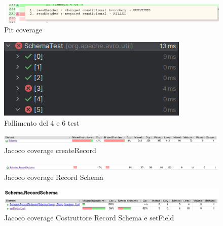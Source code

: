 \documentclass[12pt, a4paper]{article}
\begin{document}
  \begin{figure}
    \includegraphics[width=\linewidth]{./images/file_info/PitCoverageReadHeader3.png}
    \caption{Pit coverage}
    \label{fig:PitCoverageReadHeader3}
  \end{figure}

  \begin{figure}
    \includegraphics[width=\linewidth]{./images/create_record/TestFailsCreateRecord.png}
    \caption{Fallimento del 4 e 6 test}
    \label{fig:TestFailsCreateRecord}
  \end{figure}

  \begin{figure}
    \includegraphics[width=\linewidth]{./images/create_record/JacocoCoverage1.png}
    \caption{Jacoco coverage createRecord}
    \label{fig:JacocoCoverageCreateRecord1}
  \end{figure}

  \begin{figure}
    \includegraphics[width=\linewidth]{./images/create_record/JacocoCoverage2.png}
    \caption{Jacoco coverage Record Schema}
    \label{fig:JacocoCoverageCreateRecord2}
  \end{figure}

  \begin{figure}
    \includegraphics[width=\linewidth]{./images/create_record/JacocoCoverage3.png}
    \caption{Jacoco coverage Costruttore Record Schema e setField}
    \label{fig:JacocoCoverageCreateRecord3}
  \end{figure}
\end{document}
